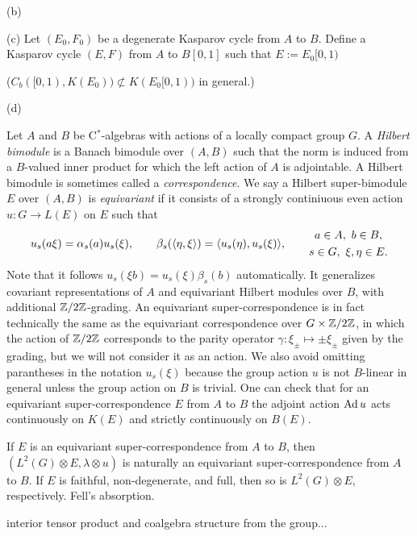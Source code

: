 \documentclass{../../large}
\begin{document}
\begin{pf}
(b)



(c)
Let $(E_0,F_0)$ be a degenerate Kasparov cycle from $A$ to $B$.
Define a Kasparov cycle $(E,F)$ from $A$ to $B[0,1]$ such that $E:=E_0[0,1)$

($C_b([0,1),K(E_0))\not\subset K(E_0[0,1))$ in general.)

(d)
\end{pf}


\begin{prb}
Let $A$ and $B$ be C$^*$-algebras with actions of a locally compact group $G$.
A \emph{Hilbert bimodule} is a Banach bimodule over $(A,B)$ such that the norm is induced from a $B$-valued inner product for which the left action of $A$ is adjointable.
A Hilbert bimodule is sometimes called a \emph{correspondence}.
We say a Hilbert super-bimodule $E$ over $(A,B)$ is \emph{equivariant} if it consists of a strongly continiuous even action $u:G\to L(E)$ on $E$ such that
\[u_s(a\xi)=\alpha_s(a)u_s(\xi),\qquad\beta_s(\langle\eta,\xi\rangle)=\langle u_s(\eta),u_s(\xi)\rangle,\qquad
\begin{gathered}
a\in A,\ b\in B,\\s\in G,\ \xi,\eta\in E.
\end{gathered}\]
Note that it follows $u_s(\xi b)=u_s(\xi)\beta_s(b)$ automatically.
It generalizes covariant representations of $A$ and equivariant Hilbert modules over $B$, with additional $\mathbb{Z}/2\mathbb{Z}$-grading.
An equivariant super-correspondence is in fact technically the same as the equivariant correspondence over $G\times\mathbb{Z}/2\mathbb{Z}$, in which the action of $\mathbb{Z}/2\mathbb{Z}$ corresponds to the parity operator $\gamma:\xi_\pm\mapsto\pm\xi_\pm$ given by the grading, but we will not consider it as an action.
We also avoid omitting parantheses in the notation $u_s(\xi)$ because the group action $u$ is not $B$-linear in general unless the group action on $B$ is trivial.
One can check that for an equivariant super-correspondence $E$ from $A$ to $B$ the adjoint action $\operatorname{Ad} u$ acts continuously on $K(E)$ and strictly continuously on $B(E)$.
\begin{parts}
\item If $E$ is an equivariant super-correspondence from $A$ to $B$, then $(L^2(G)\otimes E,\lambda\otimes u)$ is naturally an equivariant super-correspondence from $A$ to $B$.
If $E$ is faithful, non-degenerate, and full, then so is $L^2(G)\otimes E$, respectively.
Fell's absorption.
\item interior tensor product and coalgebra structure from the group...
\end{parts}
\end{prb}
\end{document}
